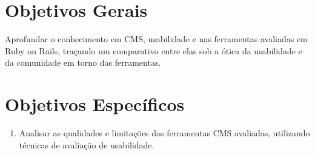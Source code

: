 \section{Objetivos Gerais}

Aprofundar o conhecimento em CMS, usabilidade e nas ferramentas avaliadas em Ruby on Rails, traçando um comparativo entre elas sob a ótica da usabilidade e da comunidade em torno das ferramentas.

\section{Objetivos Específicos}

\begin{enumerate}

\item Analisar as qualidades e limitações das ferramentas CMS avaliadas, utilizando técnicas de avaliação de usabilidade.

\end{enumerate}

